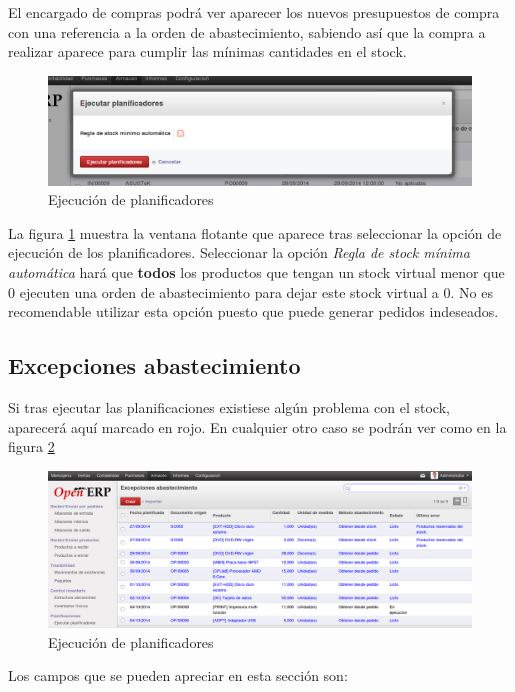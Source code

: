 El encargado de compras podrá ver aparecer los nuevos presupuestos de compra con una referencia a la orden de abastecimiento, sabiendo así que
la compra a realizar aparece para cumplir las mínimas cantidades en el stock.

\begin{figure}[H]
\includegraphics[width=\textwidth]{almacen/img/inv_plan.png}
\caption{Ejecución de planificadores}
\label{ub:inventarioplan}
\end{figure}

La figura \ref{ub:inventarioplan} muestra la ventana flotante que aparece tras seleccionar la opción de ejecución de los planificadores. Seleccionar
la opción \emph{Regla de stock mínima automática} hará que \textbf{todos} los productos que tengan un stock virtual menor que 0 ejecuten una orden
de abastecimiento para dejar este stock virtual a 0. No es recomendable utilizar esta opción puesto que puede generar pedidos indeseados.

\subsection{Excepciones abastecimiento}
Si tras ejecutar las planificaciones existiese algún problema con el stock, aparecerá aquí marcado en rojo. En cualquier otro caso se podrán ver como
en la figura \ref{ub:inventarioerr}

\begin{figure}[H]
\includegraphics[width=\textwidth]{almacen/img/inv_error.png}
\caption{Ejecución de planificadores}
\label{ub:inventarioerr}
\end{figure}

Los campos que se pueden apreciar en esta sección son:

